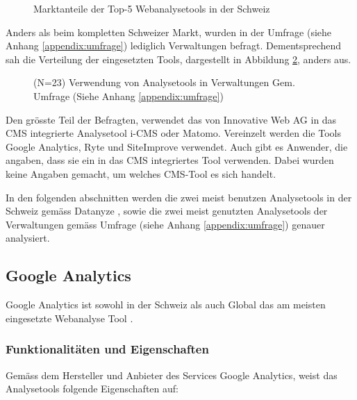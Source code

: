 \begin{figure}[h]
  \centering
{}
\caption{Marktanteile der Top-5 Webanalysetools in der Schweiz \parencite{datanyzeSwitzerlandWebanalytics}}
\label{fig:marktanteil}
\end{figure}


Anders als beim kompletten Schweizer Markt, wurden in der Umfrage (siehe Anhang \ref{appendix:umfrage}) lediglich Verwaltungen befragt. Dementsprechend sah die Verteilung der eingesetzten Tools, dargestellt in Abbildung \ref{fig:verwVerteilungTools}, anders aus.

\begin{figure}[h]
  \centering
{}
\caption{(N=23) Verwendung von Analysetools in Verwaltungen Gem. Umfrage (Siehe Anhang \ref{appendix:umfrage})}
\label{fig:verwVerteilungTools}
\end{figure}

Den grösste Teil der Befragten, verwendet das von Innovative Web AG in das CMS integrierte Analysetool i-CMS oder Matomo. Vereinzelt werden die Tools Google Analytics, Ryte und SiteImprove verwendet. Auch gibt es Anwender, die angaben, dass sie ein in das CMS integriertes Tool verwenden. Dabei wurden keine Angaben gemacht, um welches CMS-Tool es sich handelt.

In den folgenden abschnitten werden die zwei meist benutzen Analysetools in der Schweiz gemäss Datanyze \parencite{datanyzeSwitzerlandWebanalytics}, sowie die zwei meist genutzten Analysetools der Verwaltungen gemäss Umfrage (siehe Anhang \ref{appendix:umfrage}) genauer analysiert.


\subsection{Google Analytics}\label{subsec:GoogleAnalytics}
Google Analytics ist sowohl in der Schweiz als auch Global das am meisten eingesetzte Webanalyse Tool \parencite{datanyzeSwitzerlandWebanalytics}. 

\subsubsection{Funktionalitäten und Eigenschaften}
Gemäss dem Hersteller und Anbieter des Services Google Analytics, weist das Analysetools folgende Eigenschaften auf:

